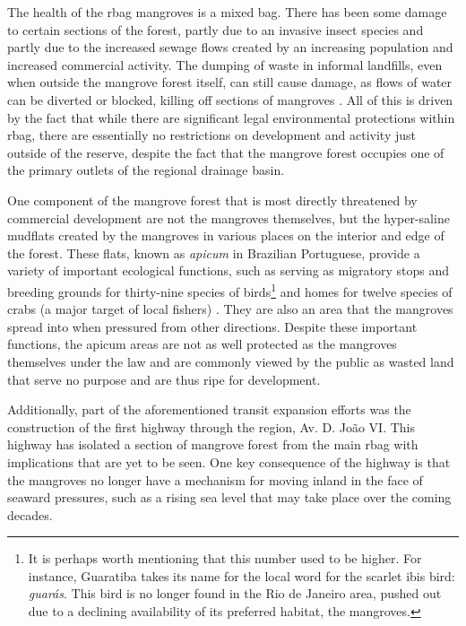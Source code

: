 The health of the \ac{rbag} mangroves is a mixed bag. There has been some damage to certain sections of the forest, partly due to an invasive insect species and partly due to the increased sewage flows created by an increasing population and increased commercial activity. The dumping of waste in informal landfills, even when outside the mangrove forest itself, can still cause damage, as flows of water can be diverted or blocked, killing off sections of mangroves \cite{castroOSDESAFIOSPLANEJAMENTO2012}. All of this is driven by the fact that while there are significant legal environmental protections within \ac{rbag}, there are essentially no restrictions on development and activity just outside of the reserve, despite the fact that the mangrove forest occupies one of the primary outlets of the regional drainage basin.

One component of the mangrove forest that is most directly threatened by commercial development are not the mangroves themselves, but the hyper-saline mudflats created by the mangroves in various places on the interior and edge of the forest. These flats, known as \textit{apicum} in Brazilian Portuguese, provide a variety of important ecological functions, such as serving as migratory stops and breeding grounds for thirty-nine species of birds\footnote{It is perhaps worth mentioning that this number used to be higher. For instance, Guaratiba takes its name for the local word for the scarlet ibis bird: \textit{guarás}. This bird is no longer found in the Rio de Janeiro area, pushed out due to a declining availability of its preferred habitat, the mangroves.} and homes for twelve species of crabs (a major target of local fishers) \cite{vicenteAvaliacaoHidrogeologicaRegioes2010}. They are also an area that the mangroves spread into when pressured from other directions. Despite these important functions, the apicum areas are not as well protected as the mangroves themselves under the law and are commonly viewed by the public as wasted land that serve no purpose and are thus ripe for development.

Additionally, part of the aforementioned transit expansion efforts was the construction of the first highway through the region, Av. D. João VI. This highway has isolated a section of mangrove forest from the main \ac{rbag} with implications that are yet to be seen. One key consequence of the highway is that the mangroves no longer have a mechanism for moving inland in the face of seaward pressures, such as a rising sea level that may take place over the coming decades.

